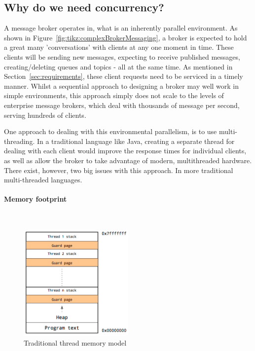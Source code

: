 \subsection{Why do we need concurrency?}
\label{sub:whyConcurrency}

A message broker operates in, what is an inherently parallel environment. As
shown in Figure~\ref{fig:tikz:complexBrokerMessaging}, a broker is expected to
hold a great many 'conversations' with clients at any one moment in time. These
clients will be sending new messages, expecting to receive published messages,
creating/deleting queues and topics - all at the same time. As mentioned in
Section~\ref{sec:requirements}, these client requests need to be serviced in a
timely manner. Whilst a sequential approach to designing a broker may well work
in simple environments, this approach simply does not scale to the levels of
enterprise message brokers, which deal with thousands of message per second,
serving hundreds of clients.

One approach to dealing with this environmental parallelism, is to use
multi-threading. In a traditional language like Java, creating a separate thread
for dealing with each client would improve the response times for individual
clients, as well as allow the broker to take advantage of modern, multithreaded
hardware. There exist, however, two big issues with this approach. In more
traditional multi-threaded languages.

\paragraph{Memory footprint} \mbox{}\\

\begin{figure}[H]
  \centering
  \includegraphics[width=0.5\textwidth]{figures/threads}
  \caption{Traditional thread memory model \cite{performanceWithoutTheEventLoop}}
  \label{fig:threadMemoryModel}
\end{figure}

